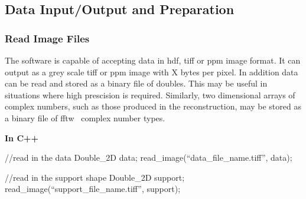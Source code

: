 \documentclass[]{cxs-software}
\begin{document}

\DefineShortVerb{\!}


\subsection{Data Input/Output and Preparation}

\subsubsection{Read Image Files}

\label{subsec:read_images}

The software is capable of accepting data in hdf, tiff or ppm image
format. It can output as a grey scale tiff or ppm image with X bytes
per pixel. In addition data can be read and stored as a binary file of
doubles. This may be useful in situations where high prescision is
required. Similarly, two dimensional arrays of complex numbers, such
as those produced in the reconstruction, may be stored as a binary
file of fftw~\cite{} complex number types.

{\bf In C++} 
\begin{myverbatim}[language=C++]
  //read in the data
  Double_2D data;
  read_image(``data_file_name.tiff'', data);
  
  //read in the support shape
  Double_2D support;
  read_image(``support_file_name.tiff'', support);
  \end{myverbatim}
\end{document}
